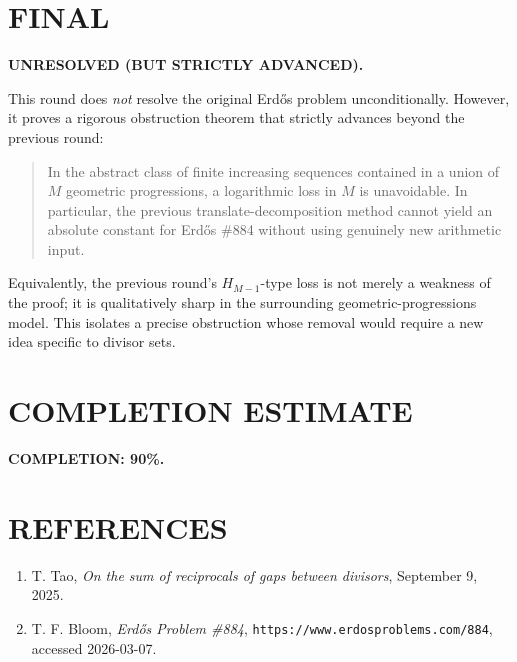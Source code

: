 \section{FINAL}

\textbf{UNRESOLVED (BUT STRICTLY ADVANCED).}

This round does \emph{not} resolve the original Erd\H{o}s problem unconditionally. However, it proves a rigorous obstruction theorem that strictly advances beyond the previous round:

\begin{quote}
In the abstract class of finite increasing sequences contained in a union of \(M\) geometric progressions, a logarithmic loss in \(M\) is unavoidable. In particular, the previous translate-decomposition method cannot yield an absolute constant for Erd\H{o}s \#884 without using genuinely new arithmetic input.
\end{quote}

Equivalently, the previous round's \(H_{M-1}\)-type loss is not merely a weakness of the proof; it is qualitatively sharp in the surrounding geometric-progressions model. This isolates a precise obstruction whose removal would require a new idea specific to divisor sets.

\section{COMPLETION ESTIMATE}

\noindent \textbf{COMPLETION: 90\%.}

\section{REFERENCES}

\begin{enumerate}
\item T. Tao, \emph{On the sum of reciprocals of gaps between divisors}, September 9, 2025.
\item T. F. Bloom, \emph{Erd\H{o}s Problem \#884}, \texttt{https://www.erdosproblems.com/884}, accessed 2026-03-07.
\end{enumerate}
